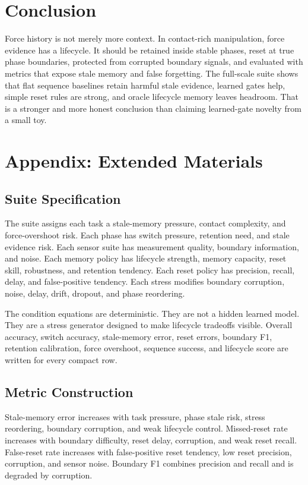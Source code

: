 \documentclass{article}
\begin{document}
\section{Conclusion}

Force history is not merely more context. In contact-rich manipulation, force
evidence has a lifecycle. It should be retained inside stable phases, reset at
true phase boundaries, protected from corrupted boundary signals, and evaluated
with metrics that expose stale memory and false forgetting. The full-scale suite
shows that flat sequence baselines retain harmful stale evidence, learned gates
help, simple reset rules are strong, and oracle lifecycle memory leaves headroom.
That is a stronger and more honest conclusion than claiming learned-gate
novelty from a small toy.

\section{Appendix: Extended Materials}

\subsection{Suite Specification}

The suite assigns each task a stale-memory pressure, contact complexity, and
force-overshoot risk. Each phase has switch pressure, retention need, and stale
evidence risk. Each sensor suite has measurement quality, boundary information,
and noise. Each memory policy has lifecycle strength, memory capacity, reset
skill, robustness, and retention tendency. Each reset policy has precision,
recall, delay, and false-positive tendency. Each stress modifies boundary
corruption, noise, delay, drift, dropout, and phase reordering.

The condition equations are deterministic. They are not a hidden learned model.
They are a stress generator designed to make lifecycle tradeoffs visible.
Overall accuracy, switch accuracy, stale-memory error, reset errors, boundary
F1, retention calibration, force overshoot, sequence success, and lifecycle
score are written for every compact row.

\subsection{Metric Construction}

Stale-memory error increases with task pressure, phase stale risk, stress
reordering, boundary corruption, and weak lifecycle control. Missed-reset rate
increases with boundary difficulty, reset delay, corruption, and weak reset
recall. False-reset rate increases with false-positive reset tendency, low reset
precision, corruption, and sensor noise. Boundary F1 combines precision and
recall and is degraded by corruption.
\end{document}
